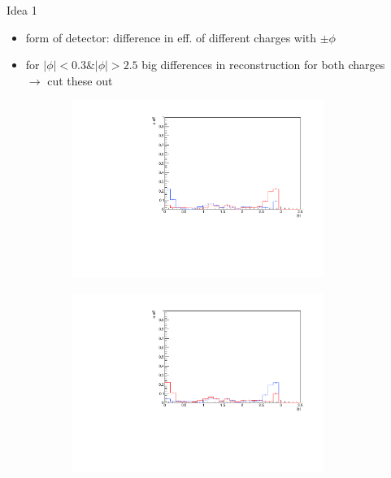\documentclass[11pt]{beamer}
\begin{document}
\begin{frame}{Idea 1}
\begin{itemize}
\item form of detector: difference in eff. of different charges with $\pm\phi$
\item for $|\phi|<0.3 \& |\phi|>2.5$ big differences in reconstruction for both charges\\
$\rightarrow$ cut these out
\end{itemize}
\begin{figure}
\begin{subfigure}{0.45\textwidth}
\includegraphics[width=0.9\textwidth]{first/up_pdf/test_u/h_phi_test_SPi_combined.pdf}
\end{subfigure}
\begin{subfigure}{0.45\textwidth}
\includegraphics[width=0.9\textwidth]{first/down_pdf/test_d/h_phi_test_SPi_combined.pdf}
\end{subfigure}
\end{figure}
\end{frame}
\end{document}
